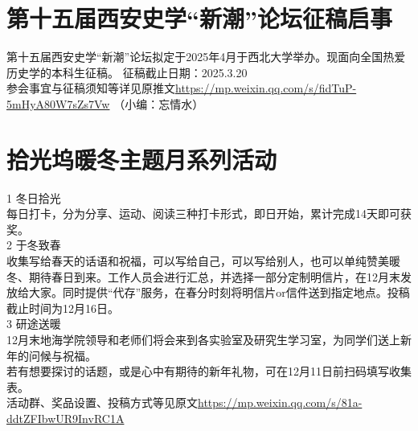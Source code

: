 \documentclass[letterpaper, 12pt]{article}
\begin{document}
\begin{multicols}{2}
\section{ 第十五届西安史学“新潮”论坛征稿启事}
第十五届西安史学“新潮”论坛拟定于2025年4月于西北大学举办。现面向全国热爱历史学的本科生征稿。
征稿截止日期：2025.3.20\\
参会事宜与征稿须知等详见原推文\url{https://mp.weixin.qq.com/s/fidTuP-5mHyA80W7sZs7Vw}
（小编：忘情水）

\section{拾光坞暖冬主题月系列活动}
1 冬日拾光 \\
每日打卡，分为分享、运动、阅读三种打卡形式，即日开始，累计完成14天即可获奖。\\
2 于冬致春\\
收集写给春天的话语和祝福，可以写给自己，可以写给别人，也可以单纯赞美暖冬、期待春日到来。工作人员会进行汇总，并选择一部分定制明信片，在12月末发放给大家。同时提供“代存”服务，在春分时刻将明信片or信件送到指定地点。投稿截止时间为12月16日。\\
3 研途送暖\\
12月末地海学院领导和老师们将会来到各实验室及研究生学习室，为同学们送上新年的问候与祝福。\\
若有想要探讨的话题，或是心中有期待的新年礼物，可在12月11日前扫码填写收集表。\\
活动群、奖品设置、投稿方式等见原文\url{https://mp.weixin.qq.com/s/81a-ddtZFIbwUR9InvRC1A}
\end{multicols} 
\end{document}
